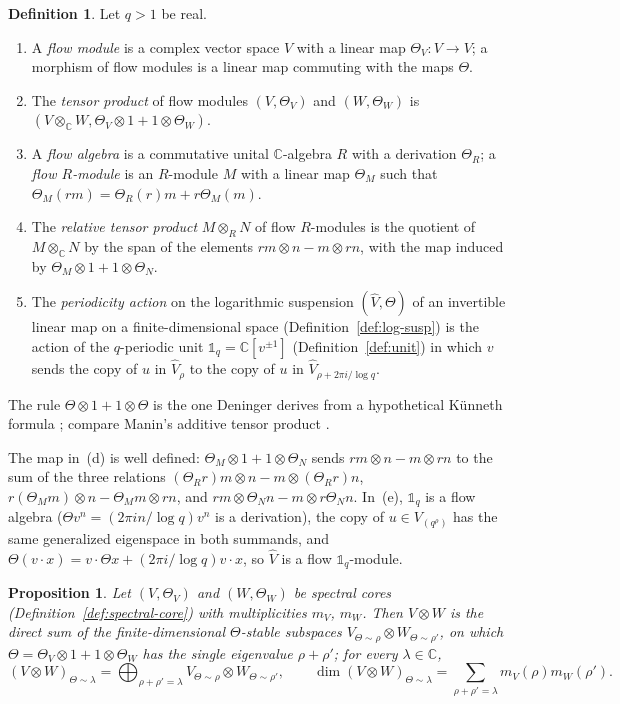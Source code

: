 \documentclass[11pt]{amsart}
\theoremstyle{plain}
\newtheorem{proposition}[theorem]{Proposition}
\theoremstyle{definition}
\newtheorem{definition}[theorem]{Definition}
\theoremstyle{remark}
\numberwithin{equation}{section}
\newcommand{\C}{\mathbb{C}}
\begin{document}
\begin{definition}\label{def:flow-module}
Let $q>1$ be real.
\begin{enumerate}[label=(\alph*)]
\item A \emph{flow module} is a complex vector space $V$ with a linear
  map $\Theta_V:V\to V$; a morphism of flow modules is a linear map
  commuting with the maps $\Theta$.
\item The \emph{tensor product} of flow modules $(V,\Theta_V)$ and
  $(W,\Theta_W)$ is $(V\otimes_\C W,\Theta_V\otimes1+1\otimes\Theta_W)$.
\item A \emph{flow algebra} is a commutative unital $\C$-algebra $R$
  with a derivation $\Theta_R$; a \emph{flow $R$-module} is an
  $R$-module $M$ with a linear map $\Theta_M$ such that
  $\Theta_M(rm)=\Theta_R(r)m+r\Theta_M(m)$.
\item The \emph{relative tensor product} $M\otimes_RN$ of flow
  $R$-modules is the quotient of $M\otimes_\C N$ by the span of the
  elements $rm\otimes n-m\otimes rn$, with the map induced by
  $\Theta_M\otimes1+1\otimes\Theta_N$.
\item The \emph{periodicity action} on the logarithmic suspension
  $(\widehat V,\Theta)$ of an invertible linear map on a
  finite-dimensional space (Definition~\ref{def:log-susp}) is the action
  of the $q$-periodic unit $\mathbb 1_q=\C[v^{\pm1}]$
  (Definition~\ref{def:unit}) in which $v$ sends the copy of $u$ in
  $\widehat V_\rho$ to the copy of $u$ in $\widehat V_{\rho+2\pi
  i/\log q}$.
\end{enumerate}
\end{definition}

The rule $\Theta\otimes1+1\otimes\Theta$ is the one Deninger derives
from a hypothetical K\"unneth formula \cite[(7.32)]{Deninger1994Motivic};
compare Manin's additive tensor product \cite[(1.22)]{Manin1995Lectures}.

The map in~(d) is well defined: $\Theta_M\otimes1+1\otimes\Theta_N$ sends
$rm\otimes n-m\otimes rn$ to the sum of the three relations
$(\Theta_Rr)m\otimes n-m\otimes(\Theta_Rr)n$,
$r(\Theta_Mm)\otimes n-\Theta_Mm\otimes rn$, and
$rm\otimes\Theta_Nn-m\otimes r\Theta_Nn$. In~(e), $\mathbb 1_q$ is a flow
algebra ($\Theta v^n=(2\pi in/\log q)v^n$ is a derivation), the copy of
$u\in V_{(q^\rho)}$ has the same generalized eigenspace in both summands,
and $\Theta(v\cdot x)=v\cdot\Theta x+(2\pi i/\log q)v\cdot x$, so
$\widehat V$ is a flow $\mathbb 1_q$-module.

\begin{proposition}\label{prop:tensor-eigen}
Let $(V,\Theta_V)$ and $(W,\Theta_W)$ be spectral cores
(Definition~\ref{def:spectral-core}) with multiplicities $m_V$, $m_W$.
Then $V\otimes W$ is the direct sum of the finite-dimensional
$\Theta$-stable subspaces $V_{\Theta\sim\rho}\otimes W_{\Theta\sim\rho'}$,
on which $\Theta=\Theta_V\otimes1+1\otimes\Theta_W$ has the single
eigenvalue $\rho+\rho'$; for every $\lambda\in\C$,
\[
(V\otimes W)_{\Theta\sim\lambda}=\bigoplus_{\rho+\rho'=\lambda}
V_{\Theta\sim\rho}\otimes W_{\Theta\sim\rho'},\qquad
\dim(V\otimes W)_{\Theta\sim\lambda}=\sum_{\rho+\rho'=\lambda}
m_V(\rho)m_W(\rho').
\]
\end{proposition}
\end{document}

